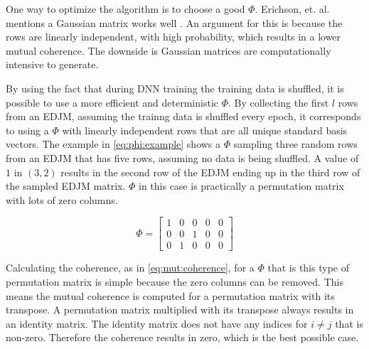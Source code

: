 One way to optimize the algorithm is to choose a good $\Phi$. Erichson, et. al. mentions a Gaussian matrix works well \cite{erichson:csvd}. An argument for this is because the rows are linearly independent, with high probability, which results in a lower mutual coherence. The downside is Gaussian matrices are computationally intensive to generate.

By using the fact that during DNN training the training data is shuffled, it is possible to use a more efficient and deterministic $\Phi$. By collecting the first $l$ rows from an EDJM, assuming the trainng data is shuffled every epoch, it corresponds to using a $\Phi$ with linearly independent rows that are all unique standard basis vectors. The example in \eqref{eq:phi:example} shows a $\Phi$ sampling three random rows from an EDJM that has five rows, assuming no data is being shuffled. A value of $1$ in $(3,2)$ results in the second row of the EDJM ending up in the third row of the sampled EDJM matrix. $\Phi$ in this case is practically a permutation matrix with lots of zero columns.

\begin{equation} \label{eq:phi:example}
    \Phi =
    \begin{bmatrix}
    1 & 0 & 0 & 0 & 0 \\
    0 & 0 & 1 & 0 & 0 \\
    0 & 1 & 0 & 0 & 0
    \end{bmatrix}
  \end{equation}

Calculating the coherence, as in \eqref{eq:mut:coherence}, for a $\Phi$ that is this type of permutation matrix is simple because the zero columns can be removed. This means the mutual coherence is computed for a permutation matrix with its transpose. A permutation matrix multiplied with its transpose always results in an identity matrix. The identity matrix does not have any indices for $i \neq j$ that is non-zero. Therefore the coherence results in zero, which is the best possible case.
